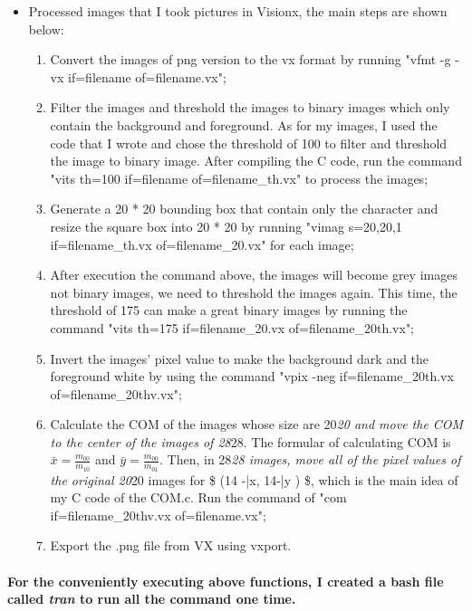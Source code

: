 \documentclass[11pt]{article}
\providecommand{\tightlist}{%
      \setlength{\itemsep}{0pt}\setlength{\parskip}{0pt}}
\begin{document}
\begin{itemize}
\tightlist
\item
  Processed images that I took pictures in Visionx, the main steps are
  shown below:

  \begin{enumerate}
  \def\labelenumi{\arabic{enumi}.}
  \tightlist
  \item
    Convert the images of png version to the vx format by running "vfmt
    -g -vx if=filename of=filename.vx";
  \item
    Filter the images and threshold the images to binary images which
    only contain the background and foreground. As for my images, I used
    the code that I wrote and chose the threshold of 100 to filter and
    threshold the image to binary image. After compiling the C code, run
    the command "vits th=100 if=filename of=filename\_th.vx" to process
    the images;
  \item
    Generate a 20 * 20 bounding box that contain only the character and
    resize the square box into 20 * 20 by running "vimag s=20,20,1
    if=filename\_th.vx of=filename\_20.vx" for each image;
  \item
    After execution the command above, the images will become grey
    images not binary images, we need to threshold the images again.
    This time, the threshold of 175 can make a great binary images by
    running the command "vits th=175 if=filename\_20.vx
    of=filename\_20th.vx";
  \item
    Invert the images' pixel value to make the background dark and the
    foreground white by using the command "vpix -neg
    if=filename\_20th.vx of=filename\_20thv.vx";
  \item
    Calculate the COM of the images whose size are 20\emph{20 and move
    the COM to the center of the images of 28}28. The formular of
    calculating COM is \(\bar x =\frac{ m_{00}}{m_{10}}\) and
    \(\bar y = \frac{m_{00}}{m_{01}}\). Then, in 28\emph{28 images, move
    all of the pixel values of the original 20}20 images for \$ (14
    -\bar x, 14-\bar y ) \$, which is the main idea of my C code of the
    COM.c. Run the command of "com if=filename\_20thv.vx
    of=filename.vx";
  \item
    Export the .png file from VX using vxport.
  \end{enumerate}
\end{itemize}

\paragraph{\texorpdfstring{For the conveniently executing above
functions, I created a bash file called \emph{tran} to run all the
command one
time.}{For the conveniently executing above functions, I created a bash file called tran to run all the command one time.}}\label{for-the-conveniently-executing-above-functions-i-created-a-bash-file-called-tran-to-run-all-the-command-one-time.}
\end{document}
